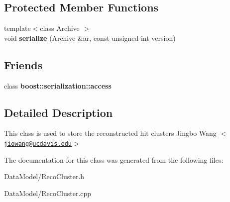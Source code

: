\subsection*{Protected Member Functions}
\begin{DoxyCompactItemize}
\item 
\hypertarget{classRecoCluster_ac56a6f1f88368e00e163caf1df7bda52}{
{\footnotesize template$<$class Archive $>$ }\\void {\bfseries serialize} (Archive \&ar, const unsigned int version)}
\label{classRecoCluster_ac56a6f1f88368e00e163caf1df7bda52}

\end{DoxyCompactItemize}
\subsection*{Friends}
\begin{DoxyCompactItemize}
\item 
\hypertarget{classRecoCluster_ac98d07dd8f7b70e16ccb9a01abf56b9c}{
class {\bfseries boost::serialization::access}}
\label{classRecoCluster_ac98d07dd8f7b70e16ccb9a01abf56b9c}

\end{DoxyCompactItemize}


\subsection{Detailed Description}
This class is used to store the reconstructed hit clusters Jingbo Wang $<$\href{mailto:jiowang@ucdavis.edu}{\tt jiowang@ucdavis.edu}$>$ 

The documentation for this class was generated from the following files:\begin{DoxyCompactItemize}
\item 
DataModel/RecoCluster.h\item 
DataModel/RecoCluster.cpp\end{DoxyCompactItemize}
